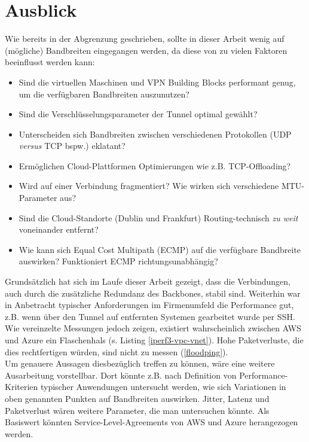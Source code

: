 \section{Ausblick}\label{ausblick}
Wie bereits in der Abgrenzung geschrieben, sollte in dieser Arbeit wenig auf (mögliche) Bandbreiten eingegangen werden, da diese von zu vielen Faktoren beeinflusst werden kann:
\begin{itemize}
    \item Sind die virtuellen Maschinen und VPN Building Blocks performant genug, um die verfügbaren Bandbreiten auszunutzen?
    \item Sind die Verschlüsselungsparameter der Tunnel optimal gewählt?
    \item Unterscheiden sich Bandbreiten zwischen verschiedenen Protokollen (UDP \textit{versus} TCP bspw.) eklatant?
    \item Ermöglichen Cloud-Plattformen Optimierungen wie z.B. TCP-Offloading?
    \item Wird auf einer Verbindung fragmentiert? Wie wirken sich verschiedene MTU-Parameter aus?
    \item Sind die Cloud-Standorte (Dublin und Frankfurt) Routing-technisch \textit{zu weit} voneinander entfernt?
    \item Wie kann sich Equal Cost Multipath (ECMP) auf die verfügbare Bandbreite auswirken? Funktioniert ECMP richtungsunabhängig?
\end{itemize}
Grundsätzlich hat sich im Laufe dieser Arbeit gezeigt, dass die Verbindungen, auch durch die zusätzliche Redundanz des Backbones, stabil sind. Weiterhin war in Anbetracht typischer Anforderungen im Firmenumfeld die Performance gut, z.B. wenn über den Tunnel auf entfernten Systemen gearbeitet wurde per SSH. Wie vereinzelte Messungen jedoch zeigen, existiert wahrscheinlich zwischen AWS und Azure ein Flaschenhals (s. Listing \ref{iperf3-vpc-vnet}). Hohe Paketverluste, die dies rechtfertigen würden, sind nicht zu messen (\ref{floodping}).\\
Um genauere Aussagen diesbezüglich treffen zu können, wäre eine weitere Ausarbeitung vorstellbar. Dort könnte z.B. nach Definition von Performance-Kriterien typischer Anwendungen untersucht werden, wie sich Variationen in oben genannten Punkten auf Bandbreiten auswirken. Jitter, Latenz und Paketverlust wären weitere Parameter, die man untersuchen könnte. Als Basiswert könnten Service-Level-Agreements von AWS und Azure herangezogen werden.\\
